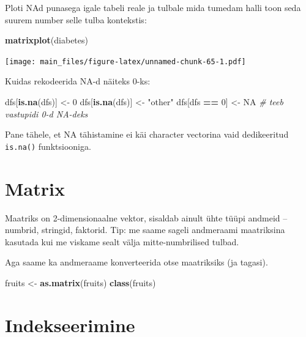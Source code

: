 \documentclass[]{book}
\newenvironment{Shaded}{\begin{snugshade}}{\end{snugshade}}
\newcommand{\KeywordTok}[1]{\textcolor[rgb]{0.13,0.29,0.53}{\textbf{#1}}}
\newcommand{\DecValTok}[1]{\textcolor[rgb]{0.00,0.00,0.81}{#1}}
\newcommand{\StringTok}[1]{\textcolor[rgb]{0.31,0.60,0.02}{#1}}
\newcommand{\CommentTok}[1]{\textcolor[rgb]{0.56,0.35,0.01}{\textit{#1}}}
\newcommand{\OtherTok}[1]{\textcolor[rgb]{0.56,0.35,0.01}{#1}}
\newcommand{\OperatorTok}[1]{\textcolor[rgb]{0.81,0.36,0.00}{\textbf{#1}}}
\newcommand{\NormalTok}[1]{#1}
\begin{document}
Ploti NAd punasega igale tabeli reale ja tulbale mida tumedam halli toon
seda suurem number selle tulba kontekstis:

\begin{Shaded}
\begin{Highlighting}[]
\KeywordTok{matrixplot}\NormalTok{(diabetes) }
\end{Highlighting}
\end{Shaded}

\texttt{[image: main\_files/figure-latex/unnamed-chunk-65-1.pdf]}

Kuidas rekodeerida NA-d näiteks 0-ks:

\begin{Shaded}
\begin{Highlighting}[]
\NormalTok{dfs[}\KeywordTok{is.na}\NormalTok{(dfs)] <-}\StringTok{ }\DecValTok{0}
\NormalTok{dfs[}\KeywordTok{is.na}\NormalTok{(dfs)] <-}\StringTok{ "other"}
\NormalTok{dfs[dfs }\OperatorTok{==}\StringTok{ }\DecValTok{0}\NormalTok{] <-}\StringTok{ }\OtherTok{NA} \CommentTok{# teeb vastupidi 0-d NA-deks}
\end{Highlighting}
\end{Shaded}

Pane tähele, et NA tähistamine ei käi character vectorina vaid
dedikeeritud \texttt{is.na()} funktsiooniga.

\section{Matrix}\label{matrix}

Maatriks on 2-dimensionaalne vektor, sisaldab ainult ühte tüüpi andmeid
-- numbrid, stringid, faktorid. Tip: me saame sageli andmeraami
maatriksina kasutada kui me viskame sealt välja mitte-numbrilised
tulbad.

Aga saame ka andmeraame konverteerida otse maatriksiks (ja tagasi).

\begin{Shaded}
\begin{Highlighting}[]
\NormalTok{fruits <-}\StringTok{ }\KeywordTok{as.matrix}\NormalTok{(fruits)}
\KeywordTok{class}\NormalTok{(fruits)}
\end{Highlighting}
\end{Shaded}

\section{Indekseerimine}\label{indekseerimine}
\end{document}
